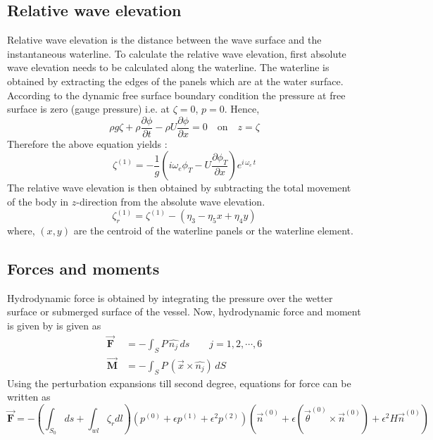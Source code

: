 \subsection{Relative wave elevation}
Relative wave elevation is the distance between the wave surface and the instantaneous waterline. To calculate the
relative wave elevation, first absolute wave elevation needs to be calculated along the waterline. The waterline is obtained 
by extracting the edges of the panels which are at the water surface. According to the dynamic free surface boundary 
condition the pressure at free surface is zero (gauge pressure) i.e. at $\zeta=0$, $p=0$. Hence, 
\begin{equation}
    \rho g \zeta + \rho\frac{\partial \phi}{\partial t} - \rho U \frac{\partial \phi}{\partial x} =0 \quad \text{on} \quad z=\zeta 
\end{equation}
Therefore the above equation yields :
\begin{equation}
    \zeta^{(1)} = -\frac{1}{g}\left(i\omega_e \phi_T - U\frac{\partial \phi_T}{\partial x}\right) e^{i\,\omega_e\,t}
\end{equation}
The relative wave elevation is  then obtained by subtracting the total movement of the body in $z$-direction from the
absolute wave elevation.
\begin{equation}
    \label{eq:rel_wave_ele}
    \zeta^{(1)}_r =\zeta^{(1)} - (\eta_3 - \eta_5x + \eta_4y)
\end{equation}
where, $(x, y)$ are the centroid of the waterline panels or the waterline element.


\subsection{Forces and moments}
Hydrodynamic force is obtained by integrating the pressure over the wetter surface
or submerged surface of the vessel. Now, hydrodynamic force and moment is 
given by is given as 
\begin{align}
    \boldsymbol{\vec{F}} &= -\int_S P\,\hat{n_j}\,ds \quad \quad j=1, 2,\cdots, 6 \\
    \boldsymbol{\vec{M}} &= -\int_S P\,(\vec{x}\times \hat{n_j})\,dS
\end{align}
Using the perturbation expansions till second degree, equations for force can 
be written as
\begin{equation}
    \label{eq:per_force}
    \boldsymbol{\vec{F}} = -\left(\int_{S_0}ds+\int_{wl}\zeta_r dl\right)(p^{(0)} + \epsilon p^{(1)} +
    \epsilon^2 p^{(2)}) (\vec{n}^{(0)}+\epsilon(\vec{\theta}^{(0)} \times \vec{n}^{(0)})+\epsilon^2H\vec{n}^{(0)})
\end{equation} 

